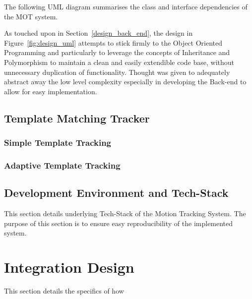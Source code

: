 The following UML diagram summarises the class and interface dependencies of the
MOT system.

\newpage
{} 
\newpage
As touched upon in Section~\ref{design_back_end}, the design in
Figure~\ref{fig:design_uml} attempts to stick firmly to the Object Oriented
Programming and particularly to leverage the concepts of Inheritance and
Polymorphism to maintain a clean and easily extendible code base, without
unnecessary duplication of functionality.  Thought was given to adequately
abstract away the low level complexity especially in developing the Back-end to
allow for easy implementation. 



\subsection{Template Matching Tracker}

\subsubsection{Simple Template Tracking}

\subsubsection{Adaptive Template Tracking}


\subsection{Development Environment and Tech-Stack}
This section details underlying Tech-Stack of the Motion Tracking System. The
purpose of this section is to ensure easy reproducibility of the implemented
system.

\section{Integration Design}
This section details the specifics of how 





